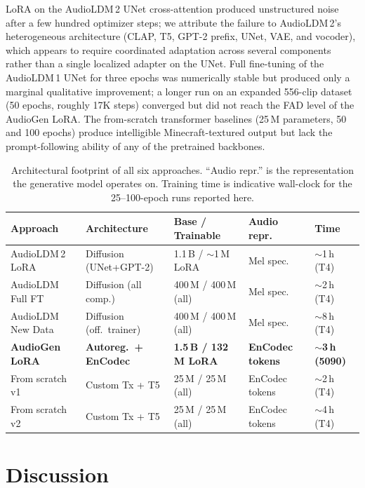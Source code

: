 \documentclass[conference]{IEEEtran}
\begin{document}
LoRA on the AudioLDM\,2 UNet cross-attention produced unstructured noise
after a few hundred optimizer steps; we attribute the failure to
AudioLDM\,2's heterogeneous architecture (CLAP, T5, GPT-2 prefix, UNet,
VAE, and vocoder), which appears to require coordinated adaptation
across several components rather than a single localized adapter on the
UNet. Full fine-tuning of the AudioLDM\,1 UNet for three epochs was
numerically stable but produced only a marginal qualitative
improvement; a longer run on an expanded 556-clip dataset (50 epochs,
roughly 17K steps) converged but did not reach the FAD level of the
AudioGen LoRA. The from-scratch transformer baselines (25\,M
parameters, 50 and 100 epochs) produce intelligible Minecraft-textured
output but lack the prompt-following ability of any of the pretrained
backbones.

\begin{table}[t]
\centering
\caption{Architectural footprint of all six approaches. ``Audio repr.''
is the representation the generative model operates on. Training time is
indicative wall-clock for the 25--100-epoch runs reported here.}
\label{tab:arch}
\setlength{\tabcolsep}{3pt}
\footnotesize
\begin{tabular}{lllll}
\toprule
Approach & Architecture & Base / Trainable & Audio repr. & Time \\
\midrule
AudioLDM\,2 LoRA   & Diffusion (UNet+GPT-2)   & 1.1\,B / $\sim$1\,M LoRA  & Mel spec.   & $\sim$1\,h (T4) \\
AudioLDM Full FT   & Diffusion (all comp.)    & 400\,M / 400\,M (all)     & Mel spec.   & $\sim$2\,h (T4) \\
AudioLDM New Data  & Diffusion (off.\ trainer)& 400\,M / 400\,M (all)     & Mel spec.   & $\sim$8\,h (T4) \\
\textbf{AudioGen LoRA} & \textbf{Autoreg.\ + EnCodec} & \textbf{1.5\,B / 132\,M LoRA} & \textbf{EnCodec tokens} & \textbf{$\sim$3\,h (5090)} \\
From scratch v1    & Custom Tx + T5           & 25\,M / 25\,M (all)       & EnCodec tokens & $\sim$2\,h (T4) \\
From scratch v2    & Custom Tx + T5           & 25\,M / 25\,M (all)       & EnCodec tokens & $\sim$4\,h (T4) \\
\bottomrule
\end{tabular}
\end{table}

\section{Discussion}
\end{document}

